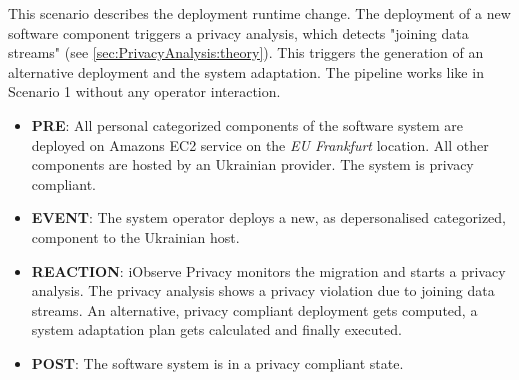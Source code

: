 This scenario describes the deployment runtime change. The deployment of a new software component triggers a privacy analysis, which detects "joining data streams" (see \autoref{sec:PrivacyAnalysis:theory}). This triggers the generation of an alternative deployment and the system adaptation. The pipeline works like in Scenario 1 without any operator interaction.
\begin{itemize}
	\setlength\itemsep{0em}
	\item \textbf{PRE}: All personal categorized components of the software system are deployed on Amazons EC2 service on the \textit{EU Frankfurt} location. All other components are hosted by an Ukrainian provider. The system is privacy compliant.
	\item \textbf{EVENT}: The system operator deploys a new, as depersonalised categorized, component to the Ukrainian host.
	\item \textbf{REACTION}: iObserve Privacy monitors the migration and starts a privacy analysis. The privacy analysis shows a privacy violation due to joining data streams. An alternative, privacy compliant deployment gets computed, a system adaptation plan gets calculated and finally executed.
	\item \textbf{POST}: The software system is in a privacy compliant state.
\end{itemize}

